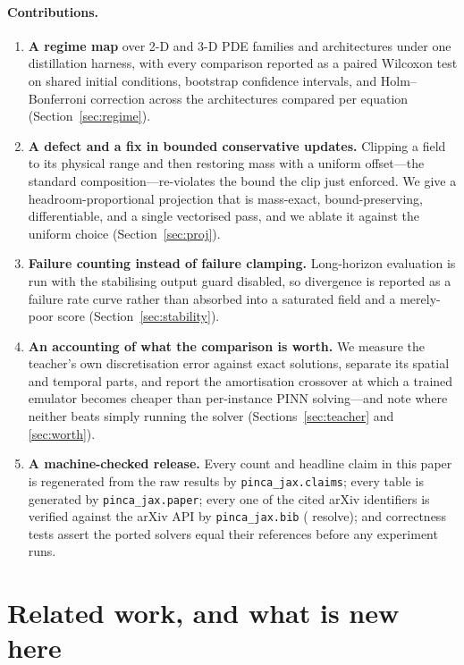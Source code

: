 \documentclass{article}
\newcommand{\code}[1]{\texttt{\small #1}}
\begin{document}
\paragraph{Contributions.}
\begin{enumerate}
\item \textbf{A regime map} over \NpdesTwoD{} 2-D and \NpdesThreeD{} 3-D PDE families and
  \Narchs{} architectures under one distillation harness, with every comparison reported
  as a paired Wilcoxon test on shared initial conditions, bootstrap confidence intervals,
  and Holm--Bonferroni correction across the architectures compared per equation
  (Section~\ref{sec:regime}).
\item \textbf{A defect and a fix in bounded conservative updates.} Clipping a field to its
  physical range and then restoring mass with a uniform offset---the standard
  composition---re-violates the bound the clip just enforced. We give a
  headroom-proportional projection that is mass-exact, bound-preserving, differentiable,
  and a single vectorised pass, and we ablate it against the uniform choice
  (Section~\ref{sec:proj}).
\item \textbf{Failure counting instead of failure clamping.} Long-horizon evaluation is
  run with the stabilising output guard disabled, so divergence is reported as a failure
  rate curve rather than absorbed into a saturated field and a merely-poor score
  (Section~\ref{sec:stability}).
\item \textbf{An accounting of what the comparison is worth.} We measure the teacher's own
  discretisation error against exact solutions, separate its spatial and temporal parts,
  and report the amortisation crossover at which a trained emulator becomes cheaper than
  per-instance PINN solving---and note where neither beats simply running the solver
  (Sections~\ref{sec:teacher} and \ref{sec:worth}).
\item \textbf{A machine-checked release.} Every count and headline claim in this paper is
  regenerated from the raw results by \code{pinca\_jax.claims}; every table is generated by
  \code{pinca\_jax.paper}; every one of the \Ncitations{} cited arXiv identifiers is
  verified against the arXiv API by \code{pinca\_jax.bib} (\Ncitationsresolved{} resolve);
  and \Ntests{} correctness tests assert the ported solvers equal their references before
  any experiment runs.
\end{enumerate}

\section{Related work, and what is new here}
\end{document}

